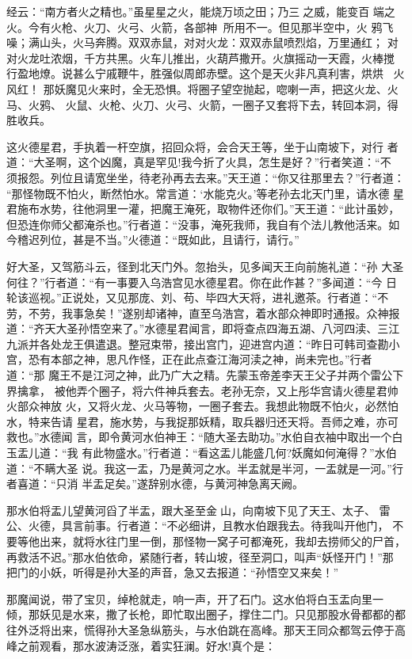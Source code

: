 经云：“南方者火之精也。”虽星星之火，能烧万顷之田；乃三之威，能变百
端之火。今有火枪、火刀、火弓、火箭，各部神，所用不一。但见那半空中，火
鸦飞噪；满山头，火马奔腾。双双赤鼠，对对火龙：双双赤鼠喷烈焰，万里通红；
对对火龙吐浓烟，千方共黑。火车儿推出，火葫芦撒开。火旗摇动一天霞，火棒搅
行盈地燎。说甚么宁戚鞭牛，胜强似周郎赤壁。这个是天火非凡真利害，烘烘
火风红！
那妖魔见火来时，全无恐惧。将圈子望空抛起，唿喇一声，把这火龙、火马、火鸦、
火鼠、火枪、火刀、火弓、火箭，一圈子又套将下去，转回本洞，得胜收兵。

这火德星君，手执着一杆空旗，招回众将，会合天王等，坐于山南坡下，对行
者道：“大圣啊，这个凶魔，真是罕见!我今折了火具，怎生是好？”行者笑道：“不
须报怨。列位且请宽坐坐，待老孙再去去来。”天王道：“你又往那里去？”行者道：
“那怪物既不怕火，断然怕水。常言道：‘水能克火。’等老孙去北天门里，请水德
星君施布水势，往他洞里一灌，把魔王淹死，取物件还你们。”天王道：“此计虽妙，
但恐连你师父都淹杀也。”行者道：“没事，淹死我师，我自有个法儿教他活来。如
今稽迟列位，甚是不当。”火德道：“既如此，且请行，请行。”

好大圣，又驾筋斗云，径到北天门外。忽抬头，见多闻天王向前施礼道：“孙
大圣何往？”行者道：“有一事要入乌浩宫见水德星君。你在此作甚？”多闻道：“今
日轮该巡视。”正说处，又见那庞、刘、苟、毕四大天将，进礼邀茶。行者道：“不
劳，不劳，我事急矣！”遂别却诸神，直至乌浩宫，着水部众神即时通报。众神报
道：“齐天大圣孙悟空来了。”水德星君闻言，即将查点四海五湖、八河四渎、三江
九派并各处龙王俱遣退。整冠束带，接出宫门，迎进宫内道：“昨日可韩司查勘小
宫，恐有本部之神，思凡作怪，正在此点查江海河渎之神，尚未完也。”行者道：“那
魔王不是江河之神，此乃广大之精。先蒙玉帝差李天王父子并两个雷公下界擒拿，
被他弄个圈子，将六件神兵套去。老孙无奈，又上彤华宫请火德星君帅火部众神放
火，又将火龙、火马等物，一圈子套去。我想此物既不怕火，必然怕水，特来告请
星君，施水势，与我捉那妖精，取兵器归还天将。吾师之难，亦可救也。”水德闻
言，即令黄河水伯神王：“随大圣去助功。”水伯自衣袖中取出一个白玉盂儿道：“我
有此物盛水。”行者道：“看这盂儿能盛几何?妖魔如何淹得？”水伯道：“不瞒大圣
说。我这一盂，乃是黄河之水。半盂就是半河，一盂就是一河。”行者喜道：“只消
半盂足矣。”遂辞别水德，与黄河神急离天阙。

那水伯将盂儿望黄河舀了半盂，跟大圣至金山，向南坡下见了天王、太子、
雷公、火德，具言前事。行者道：“不必细讲，且教水伯跟我去。待我叫开他门，
不要等他出来，就将水往门里一倒，那怪物一窝子可都淹死，我却去捞师父的尸首，
再救活不迟。”那水伯依命，紧随行者，转山坡，径至洞口，叫声“妖怪开门！”那
把门的小妖，听得是孙大圣的声音，急又去报道：“孙悟空又来矣！”

那魔闻说，带了宝贝，绰枪就走，响一声，开了石门。这水伯将白玉盂向里一
倾，那妖见是水来，撒了长枪，即忙取出圈子，撑住二门。只见那股水骨都都的都
往外泛将出来，慌得孙大圣急纵筋头，与水伯跳在高峰。那天王同众都驾云停于高
峰之前观看，那水波涛泛涨，着实狂澜。好水!真个是：

